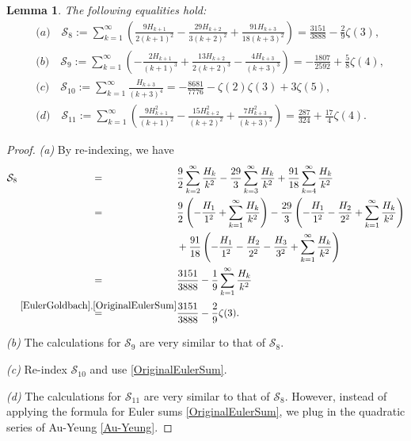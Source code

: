 \documentclass[10pt]{amsart}
\newtheorem{lemma}{Lemma}
\theoremstyle{definition}
\begin{document}
\begin{lemma} \label{ReIndexEulerSummLemma}
The following equalities hold:
\begin{align*}
    &\textit{(a)}\quad \mathcal{S}_8 := \sum_{k=1}^\infty \left(\frac{9 H_{k+1}}{2 (k+1)^2} - \frac{29 H_{k+2}}{3 (k+2)^2} + \frac{91 H_{k+3}}{18 (k+3)^2}\right) = \frac{3151}{3888} -\frac{2}{9}\zeta(3),\\
    &\textit{(b)}\quad \mathcal{S}_9 := \sum_{k=1}^\infty \left(- \frac{2 H_{k+1}}{(k+1)^3} + \frac{13 H_{k+2}}{2 (k+2)^3} - \frac{4 H_{k+3}}{(k+3)^3}\right) = -\frac{1807}{2592}+\frac{5}{8}\zeta(4),\\
    &\textit{(c)}\quad \mathcal{S}_{10} := \sum_{k=1}^\infty \frac{H_{k+3}}{(k+3)^4} = - \frac{8681}{7776} -\zeta(2) \zeta(3) + 3\zeta(5),\\
    &\textit{(d)}\quad \mathcal{S}_{11} := \sum_{k=1}^\infty \left(\frac{9 H_{k+1}^2}{(k+1)^2} - \frac{15 H_{k+2}^2}{(k+2)^2} + \frac{7 H_{k+3}^2}{(k+3)^2}\right) = \frac{287}{324} + \frac{17}{4}\zeta(4).
\end{align*}
\end{lemma}
\begin{proof}
    \textit{(a)} By re-indexing, we have
    \begin{align*}
        \mathcal{S}_8
        \overset{\phantom{\eqref{EulerGoldbach}, \eqref{OriginalEulerSum}}}{=}& \frac{9}{2}\sum_{k=2}^\infty \frac{H_k}{k^2} - \frac{29}{3}\sum_{k=3}^\infty \frac{H_k}{k^2} + \frac{91}{18}\sum_{k=4}^\infty \frac{H_k}{k^2}\\
        \overset{\phantom{\eqref{EulerGoldbach}, \eqref{OriginalEulerSum}}}{=}& \frac{9}{2}\left(-\frac{H_1}{1^2} + \sum_{k=1}^\infty \frac{H_k}{k^2}\right) - \frac{29}{3}\left(-\frac{H_1}{1^2} - \frac{H_2}{2^2} + \sum_{k=1}^\infty \frac{H_k}{k^2}\right)\\
        &+ \frac{91}{18}\left(-\frac{H_1}{1^2} - \frac{H_2}{2^2} - \frac{H_3}{3^2} + \sum_{k=1}^\infty \frac{H_k}{k^2}\right)\\
        \overset{\phantom{\eqref{EulerGoldbach}, \eqref{OriginalEulerSum}}}{=}& \frac{3151}{3888} - \frac{1}{9}\sum_{k=1}^\infty \frac{H_k}{k^2}\\
        \overset{\eqref{EulerGoldbach}, \eqref{OriginalEulerSum}}{=}& \frac{3151}{3888} - \frac{2}{9}\zeta(3).
    \end{align*}

    \noindent
    \textit{(b)} The calculations for $\mathcal{S}_9$ are very similar to that of $\mathcal{S}_8$.

    \noindent
    \textit{(c)} Re-index $\mathcal{S}_{10}$ and use \eqref{OriginalEulerSum}.

    \noindent
    \textit{(d)} The calculations for $\mathcal{S}_{11}$ are very similar to that of $\mathcal{S}_8$. However, instead of applying the formula for Euler sums \eqref{OriginalEulerSum}, we plug in the quadratic series of Au-Yeung \eqref{Au-Yeung}.
\end{proof}
\end{document}
